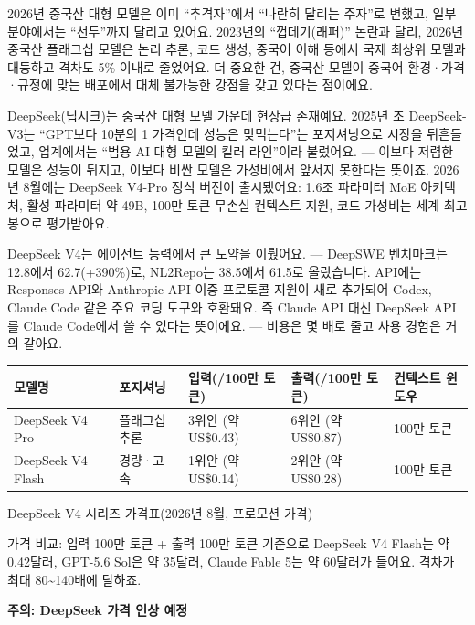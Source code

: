 2026년 중국산 대형 모델은 이미 “추격자”에서 “나란히 달리는 주자”로 변했고, 일부 분야에서는 “선두”까지 달리고 있어요. 2023년의 “껍데기(래퍼)” 논란과 달리, 2026년 중국산 플래그십 모델은 논리 추론, 코드 생성, 중국어 이해 등에서 국제 최상위 모델과 대등하고 격차도 5\% 이내로 줄었어요. 더 중요한 건, 중국산 모델이 중국어 환경·가격·규정에 맞는 배포에서 대체 불가능한 강점을 갖고 있다는 점이에요.


DeepSeek(딥시크)는 중국산 대형 모델 가운데 현상급 존재예요. 2025년 초 DeepSeek-V3는 “GPT보다 10분의 1 가격인데 성능은 맞먹는다”는 포지셔닝으로 시장을 뒤흔들었고, 업계에서는 “범용 AI 대형 모델의 킬러 라인”이라 불렀어요. — 이보다 저렴한 모델은 성능이 뒤지고, 이보다 비싼 모델은 가성비에서 앞서지 못한다는 뜻이죠. 2026년 8월에는 DeepSeek V4-Pro 정식 버전이 출시됐어요: 1.6조 파라미터 MoE 아키텍처, 활성 파라미터 약 49B, 100만 토큰 무손실 컨텍스트 지원, 코드 가성비는 세계 최고봉으로 평가받아요.

DeepSeek V4는 에이전트 능력에서 큰 도약을 이뤘어요. — DeepSWE 벤치마크는 12.8에서 62.7(+390\%)로, NL2Repo는 38.5에서 61.5로 올랐습니다. API에는 Responses API와 Anthropic API 이중 프로토콜 지원이 새로 추가되어 Codex, Claude Code 같은 주요 코딩 도구와 호환돼요. 즉 Claude API 대신 DeepSeek API를 Claude Code에서 쓸 수 있다는 뜻이에요. — 비용은 몇 배로 줄고 사용 경험은 거의 같아요.

\begin{center}
\begin{tabularx}{\linewidth}{|X|X|X|X|X|}
\hline
\textbf{모델명} & \textbf{포지셔닝} & \textbf{입력(/100만 토큰)} & \textbf{출력(/100만 토큰)} & \textbf{컨텍스트 윈도우} \tabularnewline
\hline
DeepSeek V4 Pro & 플래그십 추론 & 3위안 (약 US\$0.43) & 6위안 (약 US\$0.87) & 100만 토큰 \tabularnewline
DeepSeek V4 Flash & 경량·고속 & 1위안 (약 US\$0.14) & 2위안 (약 US\$0.28) & 100만 토큰 \tabularnewline
\hline
\end{tabularx}
\end{center}

\begin{center}\small\color{gray}DeepSeek V4 시리즈 가격표(2026년 8월, 프로모션 가격)\end{center}

가격 비교: 입력 100만 토큰 + 출력 100만 토큰 기준으로 DeepSeek V4 Flash는 약 0.42달러, GPT-5.6 Sol은 약 35달러, Claude Fable 5는 약 60달러가 들어요. 격차가 최대 80\textasciitilde{}140배에 달하죠.

\textbf{주의: DeepSeek 가격 인상 예정}\par

